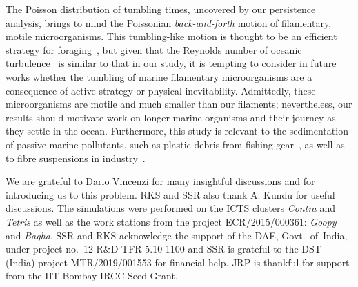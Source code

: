 \documentclass[aps,prl,twocolumn,superscriptaddress,floatfix,tightenlines,showpacs,notitlepage]{revtex4-1}
\begin{document}
The Poisson distribution of tumbling times, uncovered by our persistence
analysis, brings to mind the Poissonian \textit{back-and-forth} motion of
filamentary, motile microorganisms. This tumbling-like motion is thought to be
an efficient strategy for foraging~\cite{Luchsinger,Stocker2635}, but
given that the Reynolds number of oceanic turbulence~\cite{Jimenez} is similar
to that in our study, it is tempting to consider in future works whether the
tumbling of marine filamentary microorganisms are a consequence of active
strategy or physical inevitability. Admittedly, these microorganisms are motile
and much smaller than our filaments; nevertheless, our results should motivate
work on longer marine organisms and their journey as they settle in the ocean.
Furthermore, this study is relevant to the sedimentation of passive marine pollutants, such as plastic debris from fishing gear~\citep{Stelfox2016,Lebreton2018}, as well as to fibre suspensions in industry~\citep{Lundell2011}.

\begin{acknowledgments} We are grateful to Dario Vincenzi for many 
	insightful discussions and for introducing us 
	to this problem. RKS and SSR also thank A. Kundu for useful discussions. 
	The simulations were performed on the ICTS
	clusters {\it Contra} and {\it Tetris} as well as the work stations from
	the project ECR/2015/000361: {\it Goopy} and {\it Bagha}. SSR and RKS
	acknowledge the support of the DAE, Govt.~of~India, under project
no.~12-R\&D-TFR-5.10-1100 and SSR is grateful to the DST (India) project MTR/2019/001553 for
financial help. JRP is thankful for support from the IIT-Bombay IRCC Seed Grant.
\end{acknowledgments}


\end{document}
